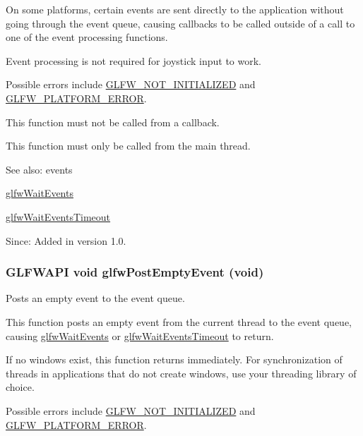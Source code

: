 On some platforms, certain events are sent directly to the application without going through the event queue, causing callbacks to be called outside of a call to one of the event processing functions.

Event processing is not required for joystick input to work.

Possible errors include \hyperlink{group__errors_g2374ee02c177f12e1fa76ff3ed15e14a}{GLFW\_\-NOT\_\-INITIALIZED} and \hyperlink{group__errors_gd44162d78100ea5e87cdd38426b8c7a1}{GLFW\_\-PLATFORM\_\-ERROR}.

This function must not be called from a callback.

This function must only be called from the main thread.

\begin{Desc}
\item[See also:]events 

\hyperlink{group__window_g6e042d05823c11e11c7339b81a237738}{glfwWaitEvents} 

\hyperlink{group__window_g05223a0a4c5e50f10f289e60398153aa}{glfwWaitEventsTimeout}\end{Desc}
\begin{Desc}
\item[Since:]Added in version 1.0. \end{Desc}
\hypertarget{group__window_gd6f6b997278c91c43b35970eb9713d7e}{
\subsubsection[glfwPostEmptyEvent]{\setlength{\rightskip}{0pt plus 5cm}GLFWAPI void glfwPostEmptyEvent (void)}}
\label{group__window_gd6f6b997278c91c43b35970eb9713d7e}


Posts an empty event to the event queue. 

This function posts an empty event from the current thread to the event queue, causing \hyperlink{group__window_g6e042d05823c11e11c7339b81a237738}{glfwWaitEvents} or \hyperlink{group__window_g05223a0a4c5e50f10f289e60398153aa}{glfwWaitEventsTimeout} to return.

If no windows exist, this function returns immediately. For synchronization of threads in applications that do not create windows, use your threading library of choice.

Possible errors include \hyperlink{group__errors_g2374ee02c177f12e1fa76ff3ed15e14a}{GLFW\_\-NOT\_\-INITIALIZED} and \hyperlink{group__errors_gd44162d78100ea5e87cdd38426b8c7a1}{GLFW\_\-PLATFORM\_\-ERROR}.

